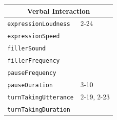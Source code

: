 \documentclass{CSSRforAfrica}
\begin{document}
\begin{table}[H]
\begin{center}
\begin{tabular}{|l l|}
\multicolumn{2}{|c|}{{\footnotesize \bf Verbal Interaction}} \\
\hline
{\footnotesize \verb+expressionLoudness+} 	           & {\footnotesize 2-24} \vspace{-1mm}\\
{\footnotesize \verb+expressionSpeed+} 	            & {\footnotesize \verb++} \vspace{-1mm}\\
{\footnotesize \verb+fillerSound+} 	                   & {\footnotesize \verb++} \vspace{-1mm}\\
{\footnotesize \verb+fillerFrequency+} 	                   & {\footnotesize \verb++} \vspace{-1mm}\\
{\footnotesize \verb+pauseFrequency+} 	           & {\footnotesize \verb++} \vspace{-1mm}\\
{\footnotesize \verb+pauseDuration+} 	                    & {\footnotesize 3-10 }\vspace{-1mm} \\
{\footnotesize \verb+turnTakingUtterance+}            & {\footnotesize 2-19, 2-23 } \vspace{-1mm}\\
{\footnotesize \verb+turnTakingDuration+} 	            & {\footnotesize \verb++}\\
\hline \hline



\end{tabular}
\end{center}
\end{table}
\end{document}
